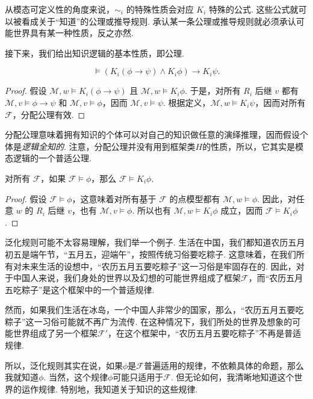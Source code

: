 从模态可定义性的角度来说，$\sim_i$ 的特殊性质会对应 $K_i$ 特殊的公式. 这些公式就可以被看成关于“知道”的公理或推导规则. 承认某一条公理或推导规则就必须承认可能世界具有某一种性质，反之亦然. 

接下来，我们给出知识逻辑的基本性质，即公理. 

\begin{proposition}[分配公理]
\[\vDash (K_i(\phi\to\psi)\wedge K_i\phi)\to K_i\psi.\]
\end{proposition}

\begin{proof}
假设 $\mathcal M,w\vDash K_i(\phi\to\psi)$ 且 $\mathcal M,w\vDash K_i \phi$. 于是，对所有 $R_i$ 后继 $v$ 都有 $\mathcal M,v\vDash\phi\to\psi$ 和 $\mathcal M,v\vDash\phi$，因而 $\mathcal M,v\vDash\psi$. 根据定义，$\mathcal M,w\vDash K_i\psi$，因而对所有 $\mathcal F$，分配公理有效. 
\end{proof}

分配公理意味着拥有知识的个体可以对自己的知识做任意的演绎推理，因而假设个体是\textit{逻辑全知的}. 注意，分配公理并没有用到框架类$H$的性质，所以，它其实是模态逻辑的一个普适公理. 

\begin{proposition}[泛化规则]
对所有 $\mathcal F$，如果 $\mathcal F\vDash\phi$，那么 $\mathcal F\vDash K_i\phi$. 
\end{proposition}

\begin{proof}
假设 $\mathcal F\vDash\phi$，这意味着对所有基于 $\mathcal F$ 的点模型都有 $\mathcal M,w\vDash\phi$. 因此，对任意 $w$ 的 $R_i$ 后继 $v$，也有 $\mathcal M,v\vDash\phi$. 所以也有 $\mathcal M,w\vDash K_i\phi$ 成立，因而 $\mathcal F\vDash K_i\phi$. 
\end{proof}


泛化规则可能不太容易理解，我们举一个例子. 生活在中国，我们都知道农历五月初五是端午节，“五月五，迎端午”，按照传统习俗要吃粽子. 这意味着，在我们所有对未来生活的设想中，“农历五月五要吃粽子”这一习俗是牢固存在的. 因此，对于中国人来说，我们身处的世界以及幻想的可能世界组成了框架$\mathcal F$，而“农历五月五吃粽子”是这个框架中的一个普适规律. 

然而，如果我们生活在冰岛，一个中国人非常少的国家，那么，“农历五月五要吃粽子”这一习俗可能就不再广为流传. 在这种情况下，我们所处的世界及想象的可能世界组成了另一个框架$\mathcal F'$，在这个框架中，“农历五月五要吃粽子”不再是普适规律. 

所以，泛化规则其实在说，如果$\phi$是$\mathcal F$普遍适用的规律，不依赖具体的命题，那么我就知道$\phi$. 当然，这个规律$\phi$可能只适用于$\mathcal F$. 但无论如何，我清晰地知道这个世界的运作规律. 特别地，我知道关于知识的这些规律. 

